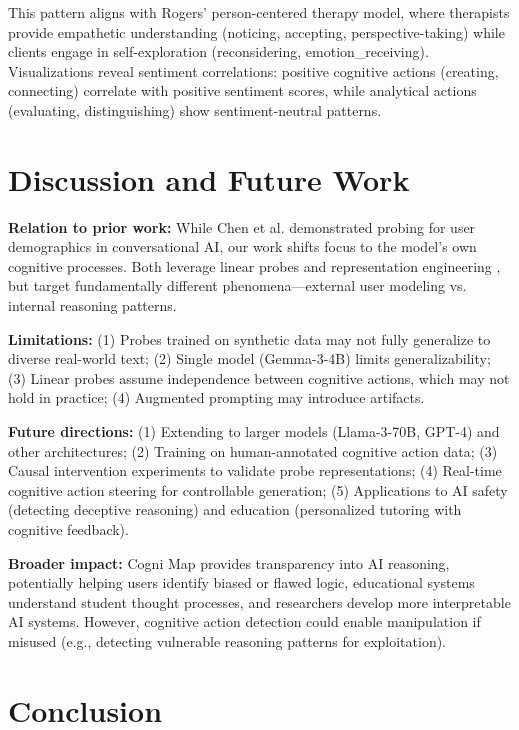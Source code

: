 \documentclass[letterpaper]{article}
\begin{document}
This pattern aligns with Rogers' person-centered therapy model, where therapists provide empathetic understanding (noticing, accepting, perspective-taking) while clients engage in self-exploration (reconsidering, emotion\_receiving). Visualizations reveal sentiment correlations: positive cognitive actions (creating, connecting) correlate with positive sentiment scores, while analytical actions (evaluating, distinguishing) show sentiment-neutral patterns.

\section{Discussion and Future Work}

\textbf{Relation to prior work:} While Chen et al. \cite{chen2024designing} demonstrated probing for user demographics in conversational AI, our work shifts focus to the model's own cognitive processes. Both leverage linear probes \cite{alain2016understanding} and representation engineering \cite{zou2023representation}, but target fundamentally different phenomena---external user modeling vs. internal reasoning patterns.

\textbf{Limitations:} (1) Probes trained on synthetic data may not fully generalize to diverse real-world text; (2) Single model (Gemma-3-4B) limits generalizability; (3) Linear probes assume independence between cognitive actions, which may not hold in practice; (4) Augmented prompting may introduce artifacts.

\textbf{Future directions:} (1) Extending to larger models (Llama-3-70B, GPT-4) and other architectures; (2) Training on human-annotated cognitive action data; (3) Causal intervention experiments to validate probe representations; (4) Real-time cognitive action steering for controllable generation; (5) Applications to AI safety (detecting deceptive reasoning) and education (personalized tutoring with cognitive feedback).

\textbf{Broader impact:} Cogni Map provides transparency into AI reasoning, potentially helping users identify biased or flawed logic, educational systems understand student thought processes, and researchers develop more interpretable AI systems. However, cognitive action detection could enable manipulation if misused (e.g., detecting vulnerable reasoning patterns for exploitation).

\section{Conclusion}
\end{document}
